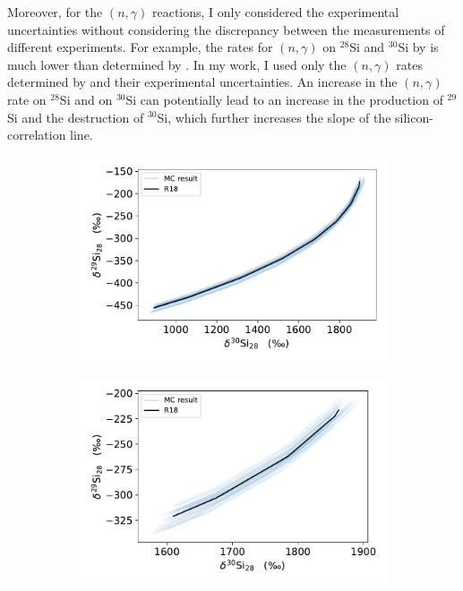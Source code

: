 \documentclass{brandeis-thesis3.2}
\newcommand{\iso}[2]{$^{#1}${#2}}
\begin{document}
Moreover, for the $(n, \gamma)$ reactions, I only considered the experimental uncertainties without considering the discrepancy between the measurements of different experiments. For example, the rates for $(n,\gamma)$ on \iso{28}{Si} and \iso{30}{Si} by \cite{guber2003} is much lower than determined by \cite{BAO200070}. In my work, I used only the $(n, \gamma)$ rates determined by \cite{guber2003} and their experimental uncertainties. An increase in the $(n, \gamma)$ rate on \iso{28}{Si} and on \iso{30}{Si} can potentially lead to an increase in the production of \iso{29}{Si} and the destruction of \iso{30}{Si}, which further increases the slope of the silicon-correlation line. 

\begin{figure}[H]
    \begin{subfigure}[c]{0.49\textwidth}
        \includegraphics[width=\textwidth]{figs/GCE_1.pdf}
    \end{subfigure}
    \begin{subfigure}[c]{0.49\textwidth}
        \includegraphics[width=\textwidth]{figs/GCE_2.pdf}

\end{subfigure}
\end{figure}
\end{document}
